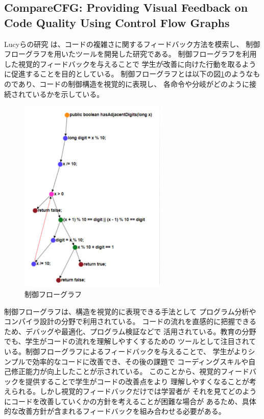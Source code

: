 \documentclass{cssspaper}
\begin{document}
            \subsection{CompareCFG: Providing Visual Feedback on Code Quality Using Control Flow Graphs}
            Lucyらの研究 \cite{6}は、コードの複雑さに関するフィードバック方法を模索し、
            制御フローグラフを用いたツールを開発した研究である。
            制御フローグラフを利用した視覚的フィードバックを与えることで
            学生が改善に向けた行動を取るように促進することを目的としている。
            制御フローグラフとは以下の図\ref{fig:flow}のようなものであり、コードの制御構造を視覚的に表現し、
            各命令や分岐がどのように接続されているかを示している。
            \begin{figure}[h]
                \centering
                \includegraphics[width=7cm]{flow.png}
                \caption{制御フローグラフ}
                \label{fig:flow}
            \end{figure}

            制御フローグラフは、構造を視覚的に表現できる手法として
            プログラム分析やコンパイラ設計の分野で利用されている。
            コードの流れを直感的に把握できるため、デバッグや最適化、プログラム検証などで
            活用されている。教育の分野でも、学生がコードの流れを理解しやすくするための
            ツールとして注目されている。制御フローグラフによるフィードバックを与えることで、
            学生がよりシンプルで効率的なコードに改善でき、その後の課題で
            コーディングスキルや自己修正能力が向上したことが示されている。
            このことから、視覚的フィードバックを提供することで学生がコードの改善点をより
            理解しやすくなることが考えられる。しかし視覚的フィードバックだけでは学習者が
            それを見てどのようにコードを改善していくかの方針を考えることが困難な場合が
            あるため、具体的な改善方針が含まれるフィードバックを組み合わせる必要がある。
\end{document}
